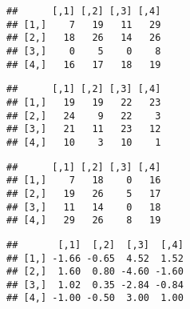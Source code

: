 \documentclass[
]{article}
\newenvironment{Shaded}{\begin{snugshade}}{\end{snugshade}}
\newcommand{\CommentTok}[1]{\textcolor[rgb]{0.56,0.35,0.01}{\textit{#1}}}
\newcommand{\KeywordTok}[1]{\textcolor[rgb]{0.13,0.29,0.53}{\textbf{#1}}}
\newcommand{\NormalTok}[1]{#1}
\newcommand{\OperatorTok}[1]{\textcolor[rgb]{0.81,0.36,0.00}{\textbf{#1}}}
\begin{document}
\begin{verbatim}
##      [,1] [,2] [,3] [,4]
## [1,]    7   19   11   29
## [2,]   18   26   14   26
## [3,]    0    5    0    8
## [4,]   16   17   18   19
\end{verbatim}

\begin{Shaded}
\end{Shaded}

\begin{verbatim}
##      [,1] [,2] [,3] [,4]
## [1,]   19   19   22   23
## [2,]   24    9   22    3
## [3,]   21   11   23   12
## [4,]   10    3   10    1
\end{verbatim}

\begin{Shaded}
\end{Shaded}

\begin{verbatim}
##      [,1] [,2] [,3] [,4]
## [1,]    7   18    0   16
## [2,]   19   26    5   17
## [3,]   11   14    0   18
## [4,]   29   26    8   19
\end{verbatim}

\begin{Shaded}
\end{Shaded}

\begin{verbatim}
##       [,1]  [,2]  [,3]  [,4]
## [1,] -1.66 -0.65  4.52  1.52
## [2,]  1.60  0.80 -4.60 -1.60
## [3,]  1.02  0.35 -2.84 -0.84
## [4,] -1.00 -0.50  3.00  1.00
\end{verbatim}

\begin{Shaded}
\end{Shaded}
\end{document}

